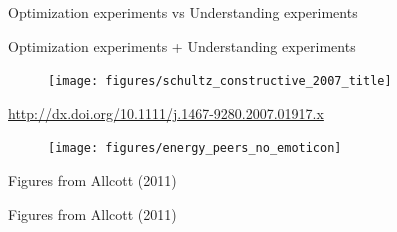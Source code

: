 \documentclass[aspectratio=169]{beamer}
\begin{document}
\begin{frame}

\Large{
\begin{center}
Optimization experiments vs  Understanding experiments
\end{center}
}

\end{frame}
\begin{frame}

\Large{
\begin{center}
Optimization experiments + Understanding experiments
\end{center}
}

\end{frame}
\begin{frame}

\begin{figure}
  \centering
  \texttt{[image: figures/schultz\_constructive\_2007\_title]}
\end{figure}

\vfill
\tiny{\url{http://dx.doi.org/10.1111/j.1467-9280.2007.01917.x}}

\end{frame}
\begin{frame}

\begin{figure}
  \centering
  \texttt{[image: figures/energy\_peers\_no\_emoticon]}
\end{figure}

\vfill
\tiny{Figures from Allcott (2011)}

\end{frame}
\begin{frame}

\begin{figure}
  \centering
\end{figure}

\end{frame}
\begin{frame}

\begin{figure}
  \centering
\end{figure}

\vfill
\tiny{Figures from Allcott (2011)}

\end{frame}
\end{document}

